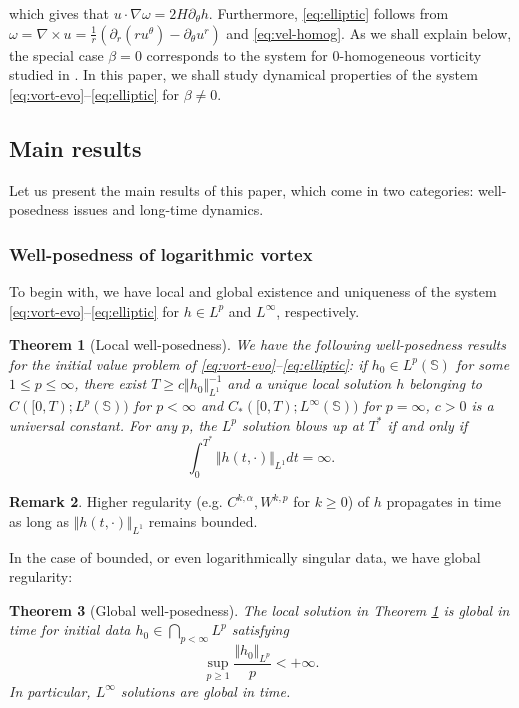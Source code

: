 \documentclass[10pt]{amsart}
\theoremstyle{plain}
\newtheorem{theorem}{Theorem}[section]
\theoremstyle{definition}
\newtheorem{remark}[theorem]{Remark}
\newcommand{\nrm}[1]{\Vert#1\Vert}
\let\rd\partial
\let\nb\nabla
\let\alp\alpha
\let\bt\beta
\let\tht\theta
\let\omg\omega
\newcommand{\bbS}{\mathbb S}
\begin{document}
which gives that $u\cdot\nb\omg = 2H\rd_\tht h$. Furthermore, \eqref{eq:elliptic} follows from $\omg = \nb\times u = \frac1r (\rd_r(ru^\tht) - \rd_\tht u^r)$ and \eqref{eq:vel-homog}. As we shall explain below, the special case $\bt=0$ corresponds to the system for $0$-homogeneous vorticity studied in \cite{EJ1,EMS}. In this paper, we shall study dynamical properties of the system \eqref{eq:vort-evo}--\eqref{eq:elliptic} for $\bt\ne0$.

\subsection{Main results}

Let us present the main results of this paper, which come in two categories: well-posedness issues and long-time dynamics.

\subsubsection*{Well-posedness of logarithmic vortex} To begin with, we have local and global existence and uniqueness of the system \eqref{eq:vort-evo}--\eqref{eq:elliptic} for $h\in L^p$ and $L^\infty$, respectively.
\begin{theorem}[Local well-posedness]\label{thm:wp-Lp}
We have the following well-posedness results for the initial value problem of \eqref{eq:vort-evo}--\eqref{eq:elliptic}: if $h_0 \in L^{p}(\bbS)$ for some $1\le p \le \infty$, there exist $T\ge c\nrm{h_0}_{L^{1}}^{-1}$ and a unique local solution $h$ belonging to $C([0,T);L^p(\bbS))$ for $p<\infty$ and $C_*([0,T);L^\infty(\bbS))$ for $p=\infty$, $c>0$ is a universal constant. For any $p$, the $L^p$ solution blows up at $T^*$ if and only if
\begin{equation*}
\int_0^{T^*} \nrm{h(t,\cdot)}_{L^{1}} dt = \infty.
\end{equation*}
\end{theorem}

\begin{remark}
Higher regularity (e.g. $C^{k,\alp}, W^{k,p}$ for $k\ge0$) of $h$ propagates in time as long as $\nrm{h(t,\cdot)}_{L^{1}}$ remains bounded.
\end{remark}

In the case of bounded, or even logarithmically singular data, we have global regularity:
\begin{theorem}[Global well-posedness]\label{thm:gwp}
The local solution in Theorem \ref{thm:wp-Lp} is global in time for initial data $h_0 \in \bigcap_{p<\infty} L^p$ satisfying
\begin{equation}\label{eq:Lp-log}
\sup_{p\ge 1} \frac{\nrm{h_0}_{L^p}}{p} < + \infty.
\end{equation}
In particular, $L^\infty$ solutions are global in time.
\end{theorem}
\end{document}
